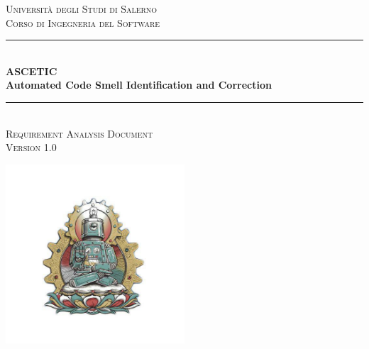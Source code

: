 \documentclass[11pt]{article}
\newcommand{\doctitle}{Requirement Analysis Document}
\newcommand{\docversion}{1.0}
\begin{document}
	
	
	\begin{titlepage} %
		\newcommand{\HRule}{\rule{\linewidth}{0.5mm}} %
		
		\center %
		
		
		\textsc{\LARGE Università degli Studi di Salerno}\\
		\textsc{\large Corso di Ingegneria del Software}\\[1.5cm] %
		
		
		\HRule\\[0.4cm]
		
		{\huge\bfseries ASCETIC}\\ %
		\vspace{0.2cm}
		{\large\bfseries Automated Code Smell Identification and Correction}\\[0.2cm] %
		
		\HRule\\[1.5cm]
		
		\textsc{\Large \doctitle}\\[0.3cm] %
		
		\textsc{\large Version \docversion}\\[0.5cm] %
		
		
		
		\vfill\vfill
		
		\includegraphics[width=0.5\textwidth]{logo_temp.jpg}\\[1cm] %
		

\end{titlepage}
\end{document}
